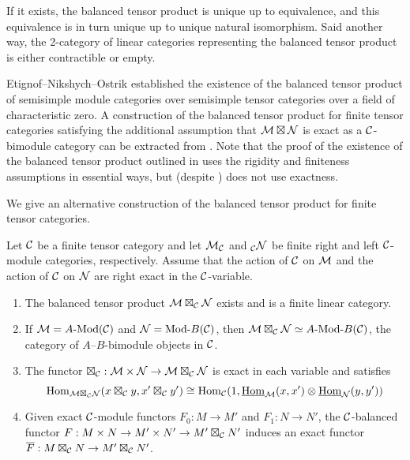 \documentclass{amsart}
\begin{document}
If it exists, the balanced tensor product is unique up to equivalence, and this equivalence is in turn unique up to unique natural isomorphism. Said another way, the 2-category of linear categories representing the balanced tensor product is either contractible or empty. 

Etignof--Nikshych--Ostrik \cite{0909.3140} established the existence of the balanced tensor product of semisimple module categories over semisimple tensor categories over a field of characteristic zero.  A construction of the balanced tensor product for finite tensor categories satisfying the additional assumption that $\mathcal M \boxtimes \mathcal N$ is exact as a $\mathcal C$-bimodule category can be extracted from \cite[Thm 3.1]{1102.3411}.  Note that the proof of the existence of the balanced tensor product outlined in \cite{MR3107567} uses the rigidity and finiteness assumptions in essential ways, but (despite \cite[Note 2.7]{MR3107567}) does not use exactness.  

We give an alternative construction of the balanced tensor product for finite tensor categories.

\begin{theorem} \label{thm:DelignePrdtOverATCExists}
	Let $\mathcal C$ be a finite tensor category and let $\mathcal M_{\mathcal C}$ and ${}_{\mathcal C}\mathcal N$ be finite right and left $\mathcal C$-module categories, respectively. Assume that the action of $\mathcal C$ on $\mathcal M$ and the action of $\mathcal C$ on $\mathcal N$ are right exact in the $\mathcal C$-variable.
	\begin{enumerate}
		\item The balanced tensor product $\mathcal M \boxtimes_{\mathcal C} \mathcal N$ exists and is a finite linear category.
		\item If $\cM = \Mod{A}{}(\cC)$ and $\cN = \Mod{}{B}(\cC)$, then $\cM \boxtimes_{\cC} \cN \simeq \Mod{A }{B}(\cC)$, the category of $A$--$B$-bimodule objects in $\mathcal C$.
		\item The functor $\boxtimes_{\mathcal C}: \mathcal M \times \mathcal N \to \mathcal M \boxtimes_{\mathcal C} \mathcal N$ is exact in each variable and satisfies 
		\begin{equation*}
			 \operatorname{Hom}_{\mathcal M \boxtimes_{\mathcal C} \mathcal N} (x \boxtimes_{\mathcal C} y, x' \boxtimes_{\mathcal C} y') \cong \operatorname{Hom}_{\mathcal C}(1, \operatorname{\underline{Hom}}_{\mathcal M}(x,x') \otimes \operatorname{\underline{Hom}}_{\mathcal N}(y, y'))
		\end{equation*}
		\item Given exact $\mathcal C$-module functors $F_0: M \to M'$ and $F_1: N \to N'$, the $\mathcal C$-balanced functor $F: M \times N \to M' \times N' \to M' \boxtimes_{\mathcal C} N'$ induces an exact functor $\overline{F}: M \boxtimes_{\mathcal C} N \to M' \boxtimes_{\mathcal C} N'$.
	\end{enumerate} 
\end{theorem}
\end{document}
